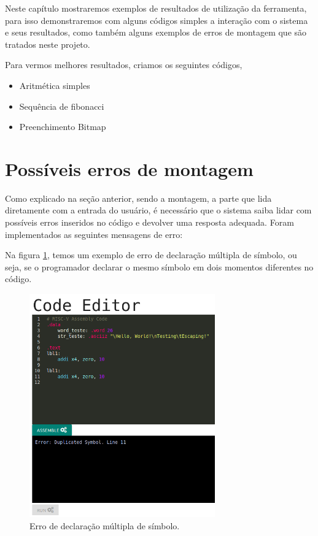 Neste capítulo mostraremos exemplos de resultados de utilização da ferramenta, para isso demonstraremos com alguns códigos simples a interação com o sistema e seus resultados, como também alguns exemplos de erros de montagem que são tratados neste projeto.

Para vermos melhores resultados, criamos os seguintes códigos,

\begin{itemize}
	\item Aritmética simples
	\item Sequência de fibonacci
	\item Preenchimento Bitmap 
\end{itemize}


\section{Possíveis erros de montagem}

	Como explicado na seção anterior, sendo a montagem, a parte que lida diretamente com a entrada do usuário, é necessário que o sistema saiba lidar com possíveis erros inseridos no código e devolver uma resposta adequada. Foram implementados as seguintes mensagens de erro:
	
	 Na figura \ref{fig:assemble_error_duplicated_symbol}, temos um exemplo de erro de declaração múltipla de símbolo, ou seja, se o programador declarar o mesmo símbolo em dois momentos diferentes no código.
	
	\begin{figure}[h!]
	  \centering
	  \includegraphics[width=8cm]{img/assemble_error_duplicated_symbol.png}
	  \caption{Erro de declaração múltipla de símbolo.}
	  \label{fig:assemble_error_duplicated_symbol}
	\end{figure}

